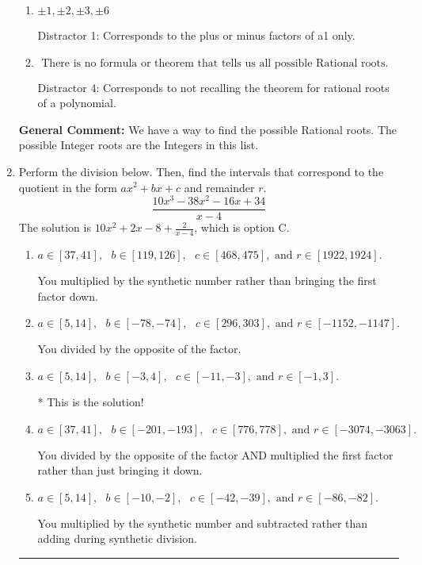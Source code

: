 \documentclass{extbook}[14pt]
\newcommand{\litem}[1]{\item #1

\rule{\textwidth}{0.4pt}}
\begin{document}
\begin{enumerate}
{\begin{enumerate}[label=\Alph*.]
 Distractor 3: Corresponds to the plus or minus of the inverse quotient (an/a0) of the factors. 
\item \( \pm 1,\pm 2,\pm 3,\pm 6 \)

 Distractor 1: Corresponds to the plus or minus factors of a1 only.
\item \( \text{ There is no formula or theorem that tells us all possible Rational roots.} \)

 Distractor 4: Corresponds to not recalling the theorem for rational roots of a polynomial.
\end{enumerate}

\textbf{General Comment:} We have a way to find the possible Rational roots. The possible Integer roots are the Integers in this list.
}
\litem{
Perform the division below. Then, find the intervals that correspond to the quotient in the form $ax^2+bx+c$ and remainder $r$.
\[ \frac{10x^{3} -38 x^{2} -16 x + 34}{x -4} \]The solution is \( 10x^{2} +2 x -8 + \frac{2}{x -4} \), which is option C.\begin{enumerate}[label=\Alph*.]
\item \( a \in [37, 41], \text{   } b \in [119, 126], \text{   } c \in [468, 475], \text{   and   } r \in [1922, 1924]. \)

 You multiplied by the synthetic number rather than bringing the first factor down.
\item \( a \in [5, 14], \text{   } b \in [-78, -74], \text{   } c \in [296, 303], \text{   and   } r \in [-1152, -1147]. \)

 You divided by the opposite of the factor.
\item \( a \in [5, 14], \text{   } b \in [-3, 4], \text{   } c \in [-11, -3], \text{   and   } r \in [-1, 3]. \)

* This is the solution!
\item \( a \in [37, 41], \text{   } b \in [-201, -193], \text{   } c \in [776, 778], \text{   and   } r \in [-3074, -3063]. \)

 You divided by the opposite of the factor AND multiplied the first factor rather than just bringing it down.
\item \( a \in [5, 14], \text{   } b \in [-10, -2], \text{   } c \in [-42, -39], \text{   and   } r \in [-86, -82]. \)

 You multiplied by the synthetic number and subtracted rather than adding during synthetic division.
\end{enumerate}

}
\end{enumerate}
\end{document}
